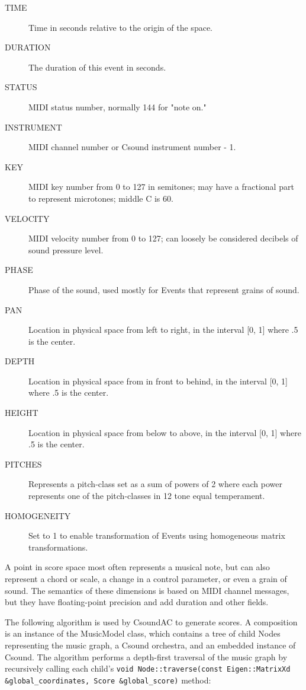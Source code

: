 \documentclass[letterpaper,10pt,DIV=12,parskip=half]{scrartcl}
\begin{document}
\begin{description}
\item[TIME] Time in seconds relative to the origin of the space.
\item[DURATION] The duration of this event in seconds.
\item[STATUS] MIDI status number, normally 144 for "note on."
\item[INSTRUMENT] MIDI channel number or Csound instrument number - 1.
\item[KEY] MIDI key number from 0 to 127 in semitones; may have a fractional part to represent microtones; middle C is 60.
\item[VELOCITY] MIDI velocity number from 0 to 127; can loosely be considered decibels of sound pressure level.
\item[PHASE] Phase of the sound, used mostly for Events that represent grains of sound.
\item[PAN] Location in physical space from left to right, in the interval [0, 1] where .5 is the center.
\item[DEPTH] Location in physical space from in front to behind, in the interval [0, 1] where .5 is the center.
\item[HEIGHT] Location in physical space from below to above, in the interval [0, 1] where .5 is the center.
\item[PITCHES] Represents a pitch-class set as a sum of powers of 2 where each power represents one of the pitch-classes in 12 tone equal temperament.
\item[HOMOGENEITY] Set to 1 to enable transformation of Events using homogeneous matrix transformations.
\end{description}

A point in score space most often represents a musical note, but can also represent a chord or scale, a change in a control parameter, or even a grain of sound. The semantics of these dimensions is based on MIDI channel messages, but they have floating-point precision and add duration and other fields.

The following algorithm is used by CsoundAC to generate scores. A composition is an instance of the MusicModel class, which contains a tree of child Nodes representing the music graph, a Csound orchestra, and an embedded instance of Csound. The algorithm performs a depth-first traversal of the music graph by recursively calling each child's \lstinline|void Node::traverse(const Eigen::MatrixXd &global_coordinates, Score &global_score)| method:
\end{document}
